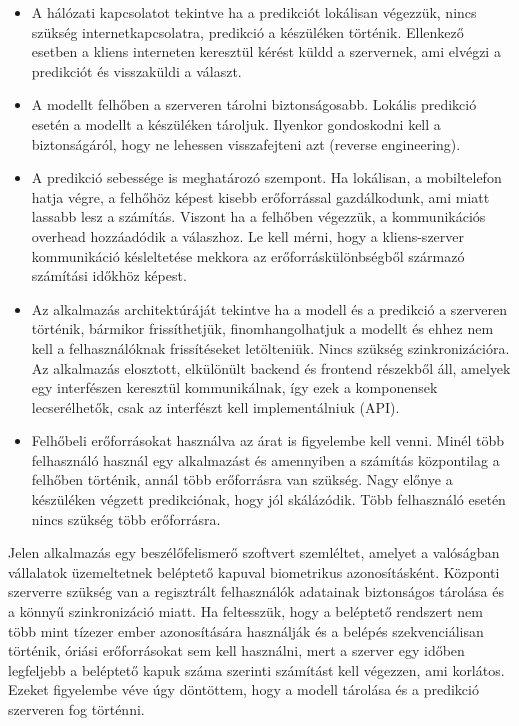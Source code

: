 \begin{itemize}
	\item A hálózati kapcsolatot tekintve ha a predikciót lokálisan végezzük, nincs szükség internetkapcsolatra, predikció a készüléken történik. Ellenkező esetben a kliens interneten keresztül kérést küldd a szervernek, ami elvégzi a predikciót és visszaküldi a választ.
	\item A modellt felhőben a szerveren tárolni biztonságosabb. Lokális predikció esetén a modellt a készüléken tároljuk. Ilyenkor gondoskodni kell a biztonságáról, hogy ne lehessen visszafejteni azt (reverse engineering).
	\item A predikció sebessége is meghatározó szempont. Ha lokálisan, a mobiltelefon hatja végre, a felhőhöz képest kisebb erőforrással gazdálkodunk, ami miatt lassabb lesz a számítás. Viszont ha a felhőben végezzük, a kommunikációs overhead hozzáadódik a válaszhoz. Le kell mérni, hogy a kliens-szerver kommunikáció késleltetése mekkora az erőforráskülönbségből származó számítási időkhöz képest.
	\item Az alkalmazás architektúráját tekintve ha a modell és a predikció a szerveren történik, bármikor frissíthetjük, finomhangolhatjuk a modellt és ehhez nem kell a felhasználóknak frissítéseket letölteniük. Nincs szükség szinkronizációra. Az alkalmazás elosztott, elkülönült backend és frontend részekből áll, amelyek egy interfészen keresztül kommunikálnak, így ezek a komponensek lecserélhetők, csak az interfészt kell implementálniuk (API).
	\item Felhőbeli erőforrásokat használva az árat is figyelembe kell venni. Minél több felhasználó használ egy alkalmazást és amennyiben a számítás központilag a felhőben történik, annál több erőforrásra van szükség. Nagy előnye a készüléken végzett predikciónak, hogy jól skálázódik. Több felhasználó esetén nincs szükség több erőforrásra.
\end{itemize}

Jelen alkalmazás egy beszélőfelismerő szoftvert szemléltet, amelyet a valóságban vállalatok üzemeltetnek beléptető kapuval biometrikus azonosításként. Központi szerverre szükség van a regisztrált felhasználók adatainak biztonságos tárolása és a könnyű szinkronizáció miatt. Ha feltesszük, hogy a beléptető rendszert nem több mint tízezer ember azonosítására használják és a belépés szekvenciálisan történik, óriási erőforrásokat sem kell használni, mert a szerver egy időben legfeljebb a beléptető kapuk száma szerinti számítást kell végezzen, ami korlátos. Ezeket figyelembe véve úgy döntöttem, hogy a modell tárolása és a predikció szerveren fog történni.

